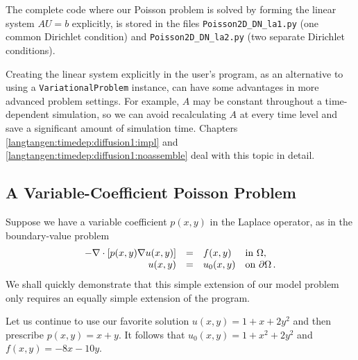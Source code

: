 The complete code where our Poisson problem is solved by forming
the linear system $AU=b$ explicitly, is stored in the files
{\fontsize{12pt}{12pt}\verb!Poisson2D_DN_la1.py!} (one common Dirichlet condition) and
{\fontsize{12pt}{12pt}\verb!Poisson2D_DN_la2.py!} (two separate Dirichlet conditions).

Creating the linear system
explicitly in the user's program, as an alternative to
using a {\fontsize{12pt}{12pt}\texttt{VariationalProblem}} instance, can have some advantages in more
advanced problem settings. For example, $A$ may be constant throughout
a time-dependent simulation, so we can avoid recalculating $A$ at
every time level and save a significant amount of simulation time. 
Chapters \ref{langtangen:timedep:diffusion1:impl} and
\ref{langtangen:timedep:diffusion1:noassemble} deal with this topic in detail.



\subsection{A Variable-Coefficient Poisson Problem}
\label{langtangen:possion:2D:varcoeff}

Suppose we have a variable coefficient $p(x,y)$ in the Laplace operator,
as in the boundary-value problem
\begin{equation} \label{langtangen:poisson:2D:varcoeff}
  \begin{array}{rcll}
    - \nabla\cdot \left\lbrack
p(x,y)\nabla u(x,y)\right\rbrack &=& f(x,y) &\mbox{in } \Omega, \\
    u(x,y) &=& u_0(x,y) &\mbox{on } \partial\Omega\thinspace .
  \end{array}
\end{equation}
We shall quickly demonstrate that this simple extension of our model
problem only requires an equally simple extension of the \fenics{} program.

Let us continue to use our favorite solution $u(x,y)=1+x+2y^2$ and 
then prescribe $p(x,y)=x+y$. It follows that
$u_0(x,y) = 1 + x^2 + 2y^2$ and $f(x,y)=-8x-10y$.

